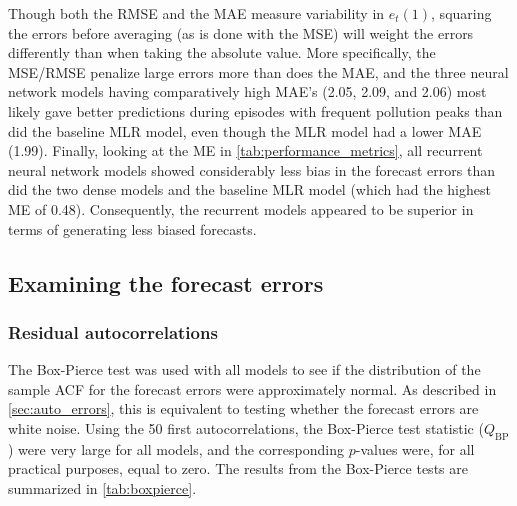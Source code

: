 \noindent
Though both the RMSE and the MAE measure variability in $e_t(1)$, squaring the errors before averaging (as is done with the MSE) will weight the errors differently than when taking the absolute value. More specifically, the MSE/RMSE penalize large errors more than does the MAE, and the three neural network models having comparatively high MAE's (2.05, 2.09, and 2.06) most likely gave better predictions during episodes with frequent pollution peaks than did the baseline MLR model, even though the MLR model had a lower MAE (1.99). Finally, looking at the ME in \cref{tab:performance_metrics}, all recurrent neural network models showed considerably less bias in the forecast errors than did the two dense models and the baseline MLR model (which had the highest ME of 0.48). Consequently, the recurrent models appeared to be superior in terms of generating less biased forecasts. 

\subsection{Examining the forecast errors}
\subsubsection{Residual autocorrelations}

The Box-Pierce test was used with all models to see if the distribution of the sample ACF for the forecast errors were approximately normal. As described in \cref{sec:auto_errors}, this is equivalent to testing whether the forecast errors are white noise. Using the 50 first autocorrelations, the Box-Pierce test statistic ($Q_{\text{BP}}$) were very large for all models, and the corresponding $p$-values were, for all practical purposes, equal to zero. The results from the Box-Pierce tests are summarized in \cref{tab:boxpierce}.

